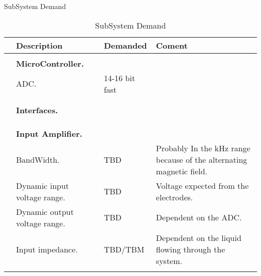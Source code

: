 SubSystem Demand 
\label{SubSystem Demand}

\begin{table}[H]
        \centering
        \begin{tabularx}{\linewidth}{|p{20pt}|X|X |X|}
                      \hline
                      
   &\textbf{Description} &\textbf{Demanded} &\textbf{Coment} 
        \\\hline
   		 &	&  &	  \\ 
       & \textbf{MicroController.}  & &
        
        \\\hline    
  
    
    &ADC.	&14-16 bit fast	&	   
        
		\\\hline    
      
                   &	&	&	   
        
		\\\hline     
                  

   		 &	&  &	  \\ 
       &\textbf{Interfaces.}  & &
        
        \\\hline          
                  
                      
    &	&	&	   
        
		\\\hline    
		                
    &	&	&	   
        
		\\\hline  
		
   		 &	&  &	  \\ 
       &\textbf{Input Amplifier.}  & &
        
        \\\hline     		  
		                
    &BandWidth.	&TBD	&Probably In the kHz range because of the alternating magnetic field.	   
        
		\\\hline    
		                
    &Dynamic input voltage range. 	&TBD	&Voltage expected from the electrodes.	   
        
		\\\hline    
		                
    &Dynamic output voltage range.	&TBD	&Dependent on the ADC.	   
        
		\\\hline    
		                
    &Input impedance.	&TBD/TBM	&Dependent on the liquid flowing through the system. 	   
        
		\\\hline    
		                
    &	&	&	   
        
		\\\hline    

\end{tabularx}
\caption{SubSystem Demand}
\label{tab:SubSystem Demand }
\end{table}













